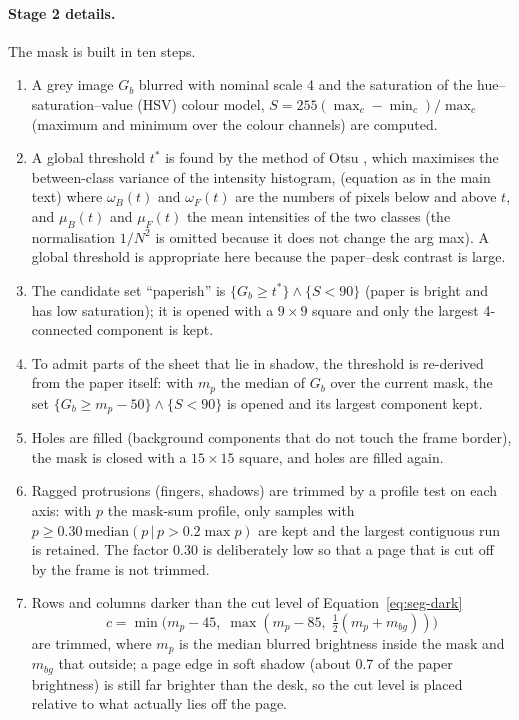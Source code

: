 \paragraph{Stage 2 details.}
The mask is built in ten steps.
\begin{enumerate}
\item A grey image $G_b$ blurred with nominal scale 4 and the saturation of the hue--saturation--value (HSV) colour model, $S=255(\max_c-\min_c)/\max_c$ (maximum and minimum over the colour channels) are computed.
\item A global threshold $t^*$ is found by the method of Otsu \cite{otsu1979}, which maximises the between-class variance of the intensity histogram,
(equation as in the main text)
where $\omega_B(t)$ and $\omega_F(t)$ are the numbers of pixels below and above $t$, and $\mu_B(t)$ and $\mu_F(t)$ the mean intensities of the two classes (the normalisation $1/N^2$ is omitted because it does not change the arg max).
A global threshold is appropriate here because the paper--desk contrast is large.
\item The candidate set ``paperish'' is $\{G_b\ge t^*\}\wedge\{S<90\}$ (paper is bright and has low saturation); it is opened with a $9\times9$ square and only the largest 4-connected component is kept.
\item To admit parts of the sheet that lie in shadow, the threshold is re-derived from the paper itself: with $m_p$ the median of $G_b$ over the current mask, the set $\{G_b\ge m_p-50\}\wedge\{S<90\}$ is opened and its largest component kept.
\item Holes are filled (background components that do not touch the frame border), the mask is closed with a $15\times15$ square, and holes are filled again.
\item Ragged protrusions (fingers, shadows) are trimmed by a profile test on each axis: with $p$ the mask-sum profile, only samples with $p\ge 0.30\,\mathrm{median}(p\,|\,p>0.2\max p)$ are kept and the largest contiguous run is retained. The factor 0.30 is deliberately low so that a page that is cut off by the frame is not trimmed.
\item Rows and columns darker than the cut level of Equation~\ref{eq:seg-dark}
\begin{equation}
c=\min\!\bigl(m_p-45,\;\max(m_p-85,\;\tfrac12(m_p+m_{bg}))\bigr)
\label{eq:seg-dark}
\end{equation}
are trimmed, where $m_p$ is the median blurred brightness inside the mask and $m_{bg}$ that outside; a page edge in soft shadow (about 0.7 of the paper brightness) is still far brighter than the desk, so the cut level is placed relative to what actually lies off the page.

\end{enumerate}
